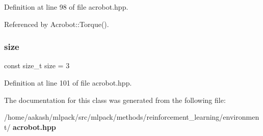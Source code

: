 Definition at line 98 of file acrobot.\+hpp.



Referenced by Acrobot\+::\+Torque().

\mbox{\label{classmlpack_1_1rl_1_1Acrobot_1_1Action_a685609860d73ccd0d45ada287ab9ab5f}} 
\subsubsection{size}
{\footnotesize\ttfamily const size\+\_\+t size = 3\hspace{0.3cm}{\ttfamily [static]}}



Definition at line 101 of file acrobot.\+hpp.



The documentation for this class was generated from the following file\+:\begin{DoxyCompactItemize}
\item 
/home/aakash/mlpack/src/mlpack/methods/reinforcement\+\_\+learning/environment/\textbf{ acrobot.\+hpp}\end{DoxyCompactItemize}
